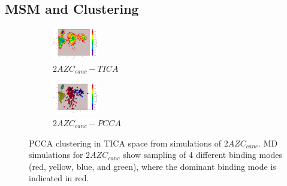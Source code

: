 

\subsection{MSM and Clustering}

\begin{figure}[!ht]
\centering
\begin{subfigure}{.5\textwidth}
  \centering
  \includegraphics[width=.9\linewidth]{chapter4/2AZC_canc/2AZC_canc-tica.pdf}
  \caption{$2AZC_{canc}-TICA$}
  \label{sup:2AZC_canc-tica}
\end{subfigure}%
\begin{subfigure}{.5\textwidth}
  \centering
  \includegraphics[width=.9\linewidth]{chapter4/2AZC_canc/2AZC_canc-pcca.pdf}
  \caption{$2AZC_{canc}-PCCA$}
  \label{sup:2AZC_canc-pcca}
\end{subfigure}
\caption{PCCA clustering in TICA space from simulations of $2AZC_{canc}$. MD simulations for $2AZC_{canc}$ show sampling of 4 different binding modes (red, yellow, blue, and green), where the dominant binding mode is indicated in red.}
\label{sup:2AZC_canc-cluster}
\end{figure}

